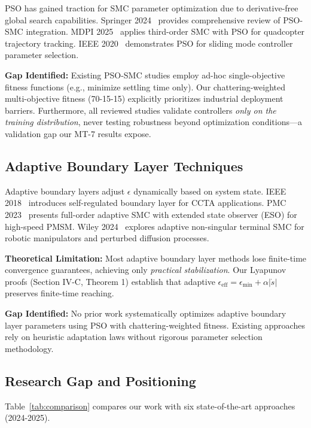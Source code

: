 \documentclass[conference]{IEEEtran}
\begin{document}
PSO has gained traction for SMC parameter optimization due to derivative-free global search capabilities. Springer 2024~\cite{springer2024pso} provides comprehensive review of PSO-SMC integration. MDPI 2025~\cite{mdpi2025quadcopter} applies third-order SMC with PSO for quadcopter trajectory tracking. IEEE 2020~\cite{ieee2020pso,ieee2020design} demonstrates PSO for sliding mode controller parameter selection.

\textbf{Gap Identified:} Existing PSO-SMC studies employ ad-hoc single-objective fitness functions (e.g., minimize settling time only). Our chattering-weighted multi-objective fitness (70-15-15) explicitly prioritizes industrial deployment barriers. Furthermore, all reviewed studies validate controllers \emph{only on the training distribution}, never testing robustness beyond optimization conditions—a validation gap our MT-7 results expose.

\subsection{Adaptive Boundary Layer Techniques}

Adaptive boundary layers adjust $\epsilon$ dynamically based on system state. IEEE 2018~\cite{ieee2018selfreg} introduces self-regulated boundary layer for CCTA applications. PMC 2023~\cite{pmc2023fullorder} presents full-order adaptive SMC with extended state observer (ESO) for high-speed PMSM. Wiley 2024~\cite{wiley2024adaptive,wiley2024boundary} explores adaptive non-singular terminal SMC for robotic manipulators and perturbed diffusion processes.

\textbf{Theoretical Limitation:} Most adaptive boundary layer methods lose finite-time convergence guarantees, achieving only \emph{practical stabilization}. Our Lyapunov proofs (Section IV-C, Theorem 1) establish that adaptive $\epsilon_{\text{eff}} = \epsilon_{\min} + \alpha|\dot{s}|$ preserves finite-time reaching.

\textbf{Gap Identified:} No prior work systematically optimizes adaptive boundary layer parameters using PSO with chattering-weighted fitness. Existing approaches rely on heuristic adaptation laws without rigorous parameter selection methodology.

\subsection{Research Gap and Positioning}

Table~\ref{tab:comparison} compares our work with six state-of-the-art approaches (2024-2025).
\end{document}
